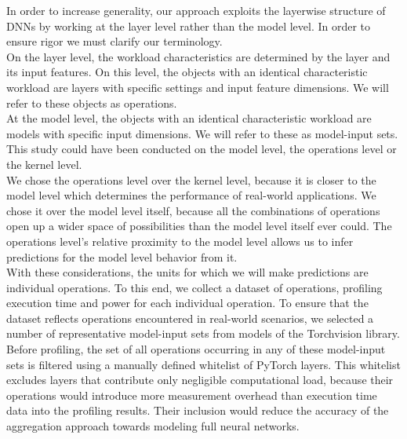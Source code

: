 In order to increase generality, our approach exploits the layerwise structure of DNNs by working at the layer level rather than the model level. In order to ensure rigor we must clarify our terminology. \\
On the layer level, the workload characteristics are determined by the layer and its input features. On this level, the objects with an identical characteristic workload are layers with specific settings and input feature dimensions. We will refer to these objects as operations. \\
At the model level, the objects with an identical characteristic workload are models with specific input dimensions. We will refer to these as model-input sets.\\ 
This study could have been conducted on the model level, the operations level or the kernel level.  \\
We chose the operations level over the kernel level, because it is  closer to the model level which determines the performance of real-world applications. We chose it over the model level itself, because all the combinations of operations open up a wider space of possibilities than the model level itself ever could. The operations level's relative proximity to the model level allows us to infer predictions for the model level behavior from it. \\
With these considerations, the units for which we will make predictions are individual operations. To this end, we collect a dataset of operations, profiling execution time and power for each individual operation. To ensure that the dataset reflects operations encountered in real-world scenarios, we selected a number of representative model-input sets from models of the Torchvision library. \\
Before profiling, the set of all operations occurring in any of these model-input sets is filtered using a manually defined whitelist of PyTorch layers. This whitelist excludes layers that contribute only negligible computational load, because their operations would introduce more measurement overhead than execution time data into the profiling results. Their inclusion would reduce the accuracy of the aggregation approach towards modeling full neural networks.







